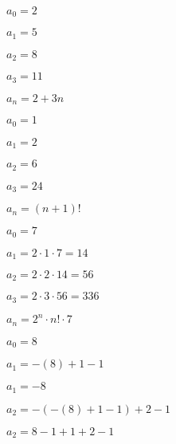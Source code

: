 \documentclass{exam}
\begin{document}
\begin{questions}
\begin{subparts}
\begin{center}
\end{center}


\begin{center}

\(a_0 = 2\)

\(a_1 = 5\)

\(a_2 = 8\)

\(a_3 = 11\)

\(a_n = 2 + 3n\)

\end{center}


\begin{center}

\(a_0 = 1\)

\(a_1 = 2\)

\(a_2 = 6\)

\(a_3 = 24\)

\(a_n = (n+1)!\)

\end{center}


\begin{center}

\(a_0 = 7\)

\(a_1 = 2 \cdot 1 \cdot 7 = 14\)

\(a_2 = 2 \cdot 2 \cdot 14 = 56\)

\(a_3 = 2 \cdot 3 \cdot 56 = 336\)

\(a_n = 2^n \cdot n! \cdot 7 \)

\end{center}



\begin{center}

\(a_0 = 8\)
\vspace{5px}

\(a_1 = -(8) + 1 - 1\)

\(a_1 = -8\)
\vspace{5px}

\(a_2 = -(-(8) + 1 - 1) + 2 - 1 \)

\(a_2 = 8 - 1 + 1 + 2 - 1 \)


\end{center}
\end{subparts}
\end{questions}
\end{document}
